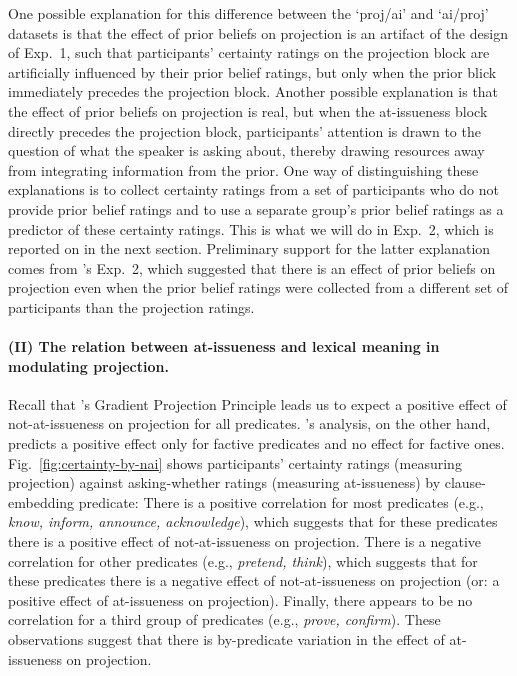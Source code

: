 \documentclass[11pt,fleqn]{article}
\newcommand{\6}{\mbox{$[\hspace*{-.6mm}[$}}
\newcommand{\9}{\mbox{$]\hspace*{-.6mm}]$}}
\newcommand{\citepos}[1]{\citeauthor{#1}'s \citeyear{#1}}
\begin{document}
One possible explanation for this difference between the `proj/ai' and `ai/proj' datasets is that the effect of prior beliefs on projection is an artifact of the design of Exp.~1, such that participants' certainty ratings on the projection block are artificially influenced by their prior belief ratings, but only when the prior blick immediately precedes the projection block. Another possible explanation is that the effect of prior beliefs on projection is real, but when the at-issueness block directly precedes the projection block, participants' attention is drawn to the question of what the speaker is asking about, thereby drawing resources away from integrating information from the prior. One way of distinguishing these explanations is to collect certainty ratings from a set of participants who do not provide prior belief ratings and to use a separate group's prior belief ratings as a predictor of these certainty ratings. This is what we will do in Exp.~2, which is reported on in the next section. Preliminary support for the latter explanation comes from \citepos{degen-tonhauser-openmind} Exp.~2, which suggested that there is an effect of prior beliefs on projection even when the prior belief ratings were collected from a different set of participants than the projection ratings.
                          
\paragraph{(II) The relation between at-issueness and lexical meaning in modulating projection.} Recall that \citepos{tbd-variability} Gradient Projection Principle leads us to expect a positive effect of not-at-issueness on projection for all predicates. \citepos{djaerv-bacovcin2020} analysis, on the other hand, predicts a positive effect only for factive predicates and no effect for factive ones. Fig.~\ref{fig:certainty-by-nai} shows participants' certainty ratings (measuring projection) against asking-whether ratings (measuring at-issueness) by clause-embedding predicate: There is a positive correlation for most predicates (e.g., {\em know, inform, announce, acknowledge}), which suggests that for these predicates there is a positive effect of not-at-issueness on projection. There is a negative correlation for other predicates (e.g., {\em pretend, think}), which suggests that for these predicates there is a negative effect of not-at-issueness on projection (or: a positive effect of at-issueness on projection). Finally, there appears to be no correlation for a third group of predicates (e.g., {\em prove, confirm}). These observations suggest that there is by-predicate variation in the effect of at-issueness on projection.
\end{document}
